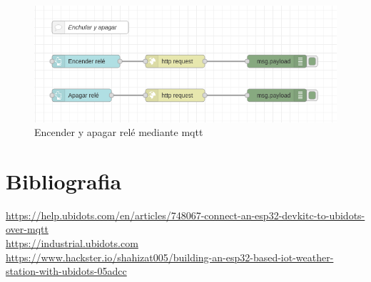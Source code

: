 \documentclass[11pt, letterpaper]{article}
\begin{document}
\begin{figure}[h]
    \centering
    \includegraphics[width=\textwidth]{enchufar_apagar_rele.png}
    \caption{Encender y apagar relé mediante mqtt}
    \label{fig:encender_apagar_mqtt}
\end{figure}

\pagebreak
\section{Bibliografia}

\url{https://help.ubidots.com/en/articles/748067-connect-an-esp32-devkitc-to-ubidots-over-mqtt}\\
\url{https://industrial.ubidots.com}\\
\url{https://www.hackster.io/shahizat005/building-an-esp32-based-iot-weather-station-with-ubidots-05adcc}\\
\end{document}
